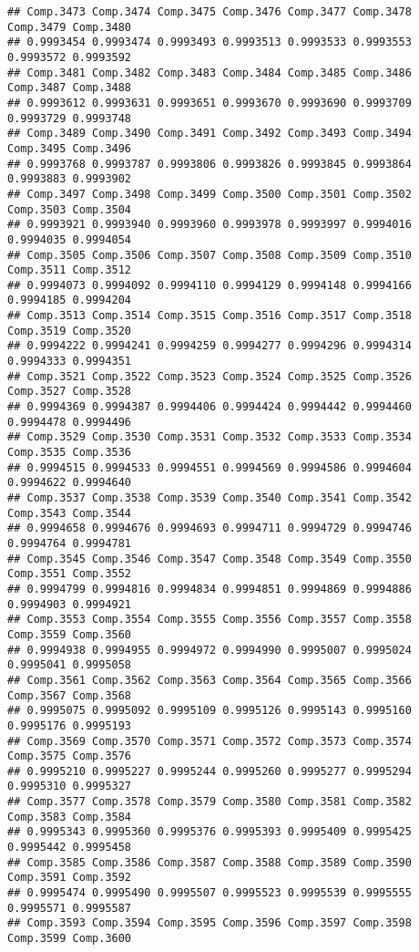 \documentclass[
]{article}
\begin{document}
\begin{verbatim}
## Comp.3473 Comp.3474 Comp.3475 Comp.3476 Comp.3477 Comp.3478 Comp.3479 Comp.3480 
## 0.9993454 0.9993474 0.9993493 0.9993513 0.9993533 0.9993553 0.9993572 0.9993592 
## Comp.3481 Comp.3482 Comp.3483 Comp.3484 Comp.3485 Comp.3486 Comp.3487 Comp.3488 
## 0.9993612 0.9993631 0.9993651 0.9993670 0.9993690 0.9993709 0.9993729 0.9993748 
## Comp.3489 Comp.3490 Comp.3491 Comp.3492 Comp.3493 Comp.3494 Comp.3495 Comp.3496 
## 0.9993768 0.9993787 0.9993806 0.9993826 0.9993845 0.9993864 0.9993883 0.9993902 
## Comp.3497 Comp.3498 Comp.3499 Comp.3500 Comp.3501 Comp.3502 Comp.3503 Comp.3504 
## 0.9993921 0.9993940 0.9993960 0.9993978 0.9993997 0.9994016 0.9994035 0.9994054 
## Comp.3505 Comp.3506 Comp.3507 Comp.3508 Comp.3509 Comp.3510 Comp.3511 Comp.3512 
## 0.9994073 0.9994092 0.9994110 0.9994129 0.9994148 0.9994166 0.9994185 0.9994204 
## Comp.3513 Comp.3514 Comp.3515 Comp.3516 Comp.3517 Comp.3518 Comp.3519 Comp.3520 
## 0.9994222 0.9994241 0.9994259 0.9994277 0.9994296 0.9994314 0.9994333 0.9994351 
## Comp.3521 Comp.3522 Comp.3523 Comp.3524 Comp.3525 Comp.3526 Comp.3527 Comp.3528 
## 0.9994369 0.9994387 0.9994406 0.9994424 0.9994442 0.9994460 0.9994478 0.9994496 
## Comp.3529 Comp.3530 Comp.3531 Comp.3532 Comp.3533 Comp.3534 Comp.3535 Comp.3536 
## 0.9994515 0.9994533 0.9994551 0.9994569 0.9994586 0.9994604 0.9994622 0.9994640 
## Comp.3537 Comp.3538 Comp.3539 Comp.3540 Comp.3541 Comp.3542 Comp.3543 Comp.3544 
## 0.9994658 0.9994676 0.9994693 0.9994711 0.9994729 0.9994746 0.9994764 0.9994781 
## Comp.3545 Comp.3546 Comp.3547 Comp.3548 Comp.3549 Comp.3550 Comp.3551 Comp.3552 
## 0.9994799 0.9994816 0.9994834 0.9994851 0.9994869 0.9994886 0.9994903 0.9994921 
## Comp.3553 Comp.3554 Comp.3555 Comp.3556 Comp.3557 Comp.3558 Comp.3559 Comp.3560 
## 0.9994938 0.9994955 0.9994972 0.9994990 0.9995007 0.9995024 0.9995041 0.9995058 
## Comp.3561 Comp.3562 Comp.3563 Comp.3564 Comp.3565 Comp.3566 Comp.3567 Comp.3568 
## 0.9995075 0.9995092 0.9995109 0.9995126 0.9995143 0.9995160 0.9995176 0.9995193 
## Comp.3569 Comp.3570 Comp.3571 Comp.3572 Comp.3573 Comp.3574 Comp.3575 Comp.3576 
## 0.9995210 0.9995227 0.9995244 0.9995260 0.9995277 0.9995294 0.9995310 0.9995327 
## Comp.3577 Comp.3578 Comp.3579 Comp.3580 Comp.3581 Comp.3582 Comp.3583 Comp.3584 
## 0.9995343 0.9995360 0.9995376 0.9995393 0.9995409 0.9995425 0.9995442 0.9995458 
## Comp.3585 Comp.3586 Comp.3587 Comp.3588 Comp.3589 Comp.3590 Comp.3591 Comp.3592 
## 0.9995474 0.9995490 0.9995507 0.9995523 0.9995539 0.9995555 0.9995571 0.9995587 
## Comp.3593 Comp.3594 Comp.3595 Comp.3596 Comp.3597 Comp.3598 Comp.3599 Comp.3600 

\end{verbatim}
\end{document}
